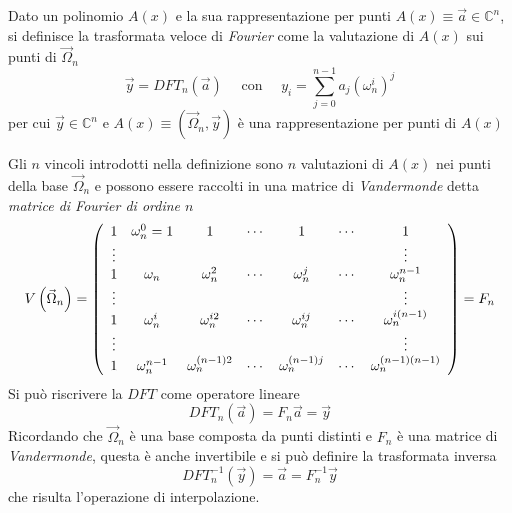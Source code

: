 \begin{definition}
    Dato un polinomio $A(x)$ e la sua rappresentazione per punti $A(x) \equiv \vec{a} \in \mathbb{C}^n$, si definisce la trasformata veloce di \textit{Fourier} come la valutazione di $A(x)$ sui punti di $\vec{\Omega}_n$
    \begin{equation*}
        \vec{y} = DFT_n \left( \vec{a} \right) \quad \text{ con } \quad y_i = \sum_{j=0}^{n-1} a_j \left( \omega_n^{i} \right)^{j}
    \end{equation*}
    per cui $\vec{y} \in \mathbb{C}^n$ e $A(x) \equiv \left( \vec{\Omega}_n , \vec{y} \right)$ è una rappresentazione per punti di $A(x)$
    \label{def:dft}
\end{definition}
Gli $n$ vincoli introdotti nella definizione sono $n$ valutazioni di $A(x)$ nei punti della base $\vec{\Omega}_n$ e possono essere raccolti in una matrice di \textit{Vandermonde} detta \emph{matrice di \emph{Fourier} di ordine $n$}
\begin{equation}
    V\left( \vec{\Omega}_n \right) = \left( 
        \begin{array}[h]{ccccccc}
            1 & \omega_n^0 = 1 & 1 & \cdots & 1 & \cdots & 1 \\
            \vdots &&&&&& \vdots\\
            1 & \omega_n & \omega_n^2 & \cdots & \omega_n^j & \cdots & \omega_n^{n-1} \\
            \vdots &&&&&& \vdots\\
            1 & \omega_n^{i} & \omega_{n}^{i2} & \cdots & \omega_{n}^{ij} & \cdots & \omega_n^{i\left( n-1 \right)} \\
            \vdots &&&&&& \vdots\\
            1 & \omega_n^{n-1} & \omega_{n}^{\left( n-1 \right) 2} & \cdots & \omega_{n}^{\left( n-1 \right) j} & \cdots & \omega_n^{\left( n-1 \right) \left( n-1 \right)} \\
        \end{array}
    \right) = F_n
    \label{eq:matricefourier}
\end{equation}
Si può riscrivere la $DFT$ come operatore lineare
\begin{equation*}
    DFT_n\left( \vec{a} \right) = F_n \vec{a} = \vec{y}
\end{equation*}
Ricordando che $\vec{\Omega}_n$ è una base composta da punti distinti e $F_n$ è una matrice di \textit{Vandermonde}, questa è anche invertibile e si può definire la trasformata inversa
\begin{equation*}
    DFT_n^{-1} \left( \vec{y} \right) = \vec{a} = F_n^{-1} \vec{y}
\end{equation*}
che risulta l'operazione di interpolazione.

